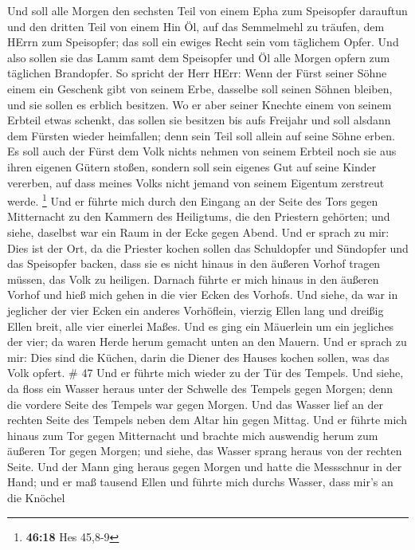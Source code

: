  Und soll alle Morgen den sechsten Teil von einem Epha zum
Speisopfer darauftun und den dritten Teil von einem Hin Öl, auf das
Semmelmehl zu träufen, dem HErrn zum Speisopfer; das soll ein ewiges
Recht sein vom täglichem Opfer.  Und also sollen sie das
Lamm samt dem Speisopfer und Öl alle Morgen opfern zum täglichen
Brandopfer.  So spricht der Herr HErr: Wenn der Fürst
seiner Söhne einem ein Geschenk gibt von seinem Erbe, dasselbe soll
seinen Söhnen bleiben, und sie sollen es erblich besitzen. 
Wo er aber seiner Knechte einem von seinem Erbteil etwas schenkt, das
sollen sie besitzen bis aufs Freijahr und soll alsdann dem Fürsten
wieder heimfallen; denn sein Teil soll allein auf seine Söhne erben.
 Es soll auch der Fürst dem Volk nichts nehmen von seinem
Erbteil noch sie aus ihren eigenen Gütern stoßen, sondern soll sein
eigenes Gut auf seine Kinder vererben, auf dass meines Volks nicht
jemand von seinem Eigentum zerstreut werde. \footnote{\textbf{46:18} Hes
  45,8-9}  Und er führte mich durch den Eingang an der
Seite des Tors gegen Mitternacht zu den Kammern des Heiligtums, die den
Priestern gehörten; und siehe, daselbst war ein Raum in der Ecke gegen
Abend.  Und er sprach zu mir: Dies ist der Ort, da die
Priester kochen sollen das Schuldopfer und Sündopfer und das Speisopfer
backen, dass sie es nicht hinaus in den äußeren Vorhof tragen müssen,
das Volk zu heiligen.  Darnach führte er mich hinaus in den
äußeren Vorhof und hieß mich gehen in die vier Ecken des Vorhofs.
 Und siehe, da war in jeglicher der vier Ecken ein anderes
Vorhöflein, vierzig Ellen lang und dreißig Ellen breit, alle vier
einerlei Maßes.  Und es ging ein Mäuerlein um ein jegliches
der vier; da waren Herde herum gemacht unten an den Mauern.
 Und er sprach zu mir: Dies sind die Küchen, darin die
Diener des Hauses kochen sollen, was das Volk opfert. \# 47 
Und er führte mich wieder zu der Tür des Tempels. Und siehe, da floss
ein Wasser heraus unter der Schwelle des Tempels gegen Morgen; denn die
vordere Seite des Tempels war gegen Morgen. Und das Wasser lief an der
rechten Seite des Tempels neben dem Altar hin gegen Mittag. 
Und er führte mich hinaus zum Tor gegen Mitternacht und brachte mich
auswendig herum zum äußeren Tor gegen Morgen; und siehe, das Wasser
sprang heraus von der rechten Seite.  Und der Mann ging
heraus gegen Morgen und hatte die Messschnur in der Hand; und er maß
tausend Ellen und führte mich durchs Wasser, dass mir's an die Knöchel
